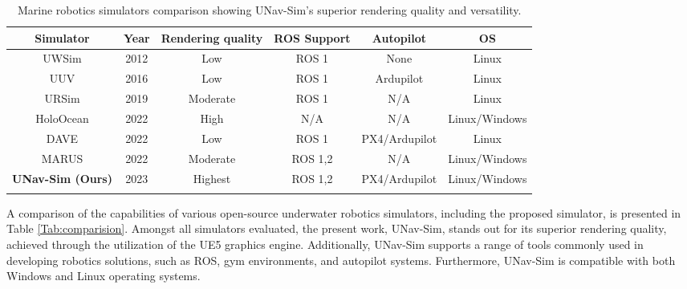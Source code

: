 \begin{table*}[t]
\caption{Marine robotics simulators comparison showing UNav-Sim's superior rendering quality and versatility.}
\centering
\footnotesize

\begin{tabular}{ cccccc}


\toprule


Simulator & Year & Rendering  quality &ROS Support& Autopilot & OS 
\\
\midrule

UWSim \cite{uwsim} & 2012 &Low& ROS 1 & None & Linux \\

UUV \cite{uuv} &2016 & Low& ROS 1 & Ardupilot & Linux 
 \\

URSim \cite{simulator:ursim} & 2019 & Moderate & ROS 1 & N/A& Linux \\

HoloOcean \cite{holoocean} & 2022 & High  & N/A& N/A  & Linux/Windows  \\

DAVE \cite{projectdave}& 2022 &Low &  ROS 1& PX4/Ardupilot  &Linux  \\

MARUS \cite{marus} & 2022 & Moderate & ROS 1,2 & N/A & Linux/Windows
  \\
\midrule

\textbf{UNav-Sim (Ours)} &2023 & Highest & ROS 1,2 & PX4/Ardupilot &  Linux/Windows \\
\bottomrule

\label{Tab:comparision}

\end{tabular}


\label{Tab:comparision2}
\end{table*}
%

A comparison of the capabilities of various open-source underwater robotics simulators, including the proposed simulator, is presented in Table \ref{Tab:comparision}. Amongst all simulators evaluated, the present work, UNav-Sim, stands out for its superior rendering quality, achieved through the utilization of the \ac{UE5} graphics engine. Additionally, UNav-Sim supports a range of tools commonly used in developing robotics solutions, such as \ac{ROS}, gym environments, and autopilot systems. Furthermore, UNav-Sim is compatible with both Windows and Linux operating systems.

